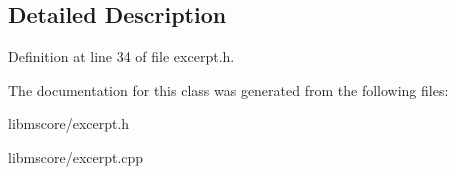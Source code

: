 \subsection{Detailed Description}


Definition at line 34 of file excerpt.\+h.



The documentation for this class was generated from the following files\+:\begin{DoxyCompactItemize}
\item 
libmscore/excerpt.\+h\item 
libmscore/excerpt.\+cpp\end{DoxyCompactItemize}

